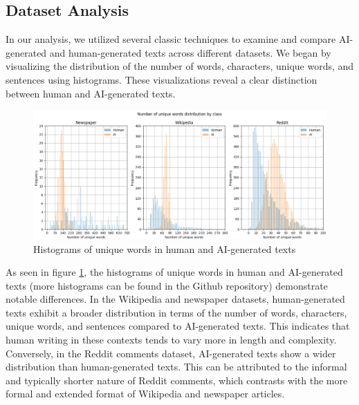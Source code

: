 \documentclass[11pt]{article}
\begin{document}
\subsection{Dataset Analysis}
In our analysis, we utilized several classic techniques to examine and compare AI-generated and human-generated texts across different datasets. We began by visualizing the distribution of the number of words, characters, unique words, and sentences using histograms. These visualizations reveal a clear distinction between human and AI-generated texts.\\
\begin{figure}[H]
  \centering
  \includegraphics[width=\linewidth]{unique_words.png}
  \caption{Histograms of unique words in human and AI-generated texts}
  \label{fig:unique_words}
\end{figure}

As seen in figure \ref{fig:unique_words}, the histograms of unique words in human and AI-generated texts (more histograms can be found in the Github repository) demonstrate notable differences.
In the Wikipedia and newspaper datasets, human-generated texts exhibit a broader distribution in terms of the number of words, characters, unique words, and sentences compared to AI-generated texts. This indicates that human writing in these contexts tends to vary more in length and complexity. Conversely, in the Reddit comments dataset, AI-generated texts show a wider distribution than human-generated texts. This can be attributed to the informal and typically shorter nature of Reddit comments, which contrasts with the more formal and extended format of Wikipedia and newspaper articles.
\end{document}
